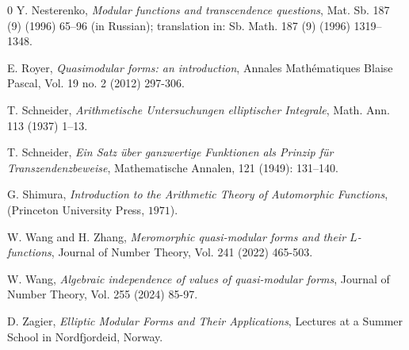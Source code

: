 \documentclass[11pt, reqno]{amsart}
\begin{document}
\begin{thebibliography}{0}
Y. Nesterenko, \textit{Modular functions and transcendence questions}, Mat. Sb. 187 (9)  (1996) 65–96 (in Russian); translation in: Sb. Math. 187 (9) (1996) 1319–1348.

E. Royer, \textit{Quasimodular forms: an introduction}, Annales Math\'ematiques Blaise Pascal, Vol. 19 no. 2 (2012) 297-306.

T. Schneider, \textit{Arithmetische Untersuchungen elliptischer Integrale}, Math. Ann. 113 (1937) 1–13.

T. Schneider, \textit{Ein Satz über ganzwertige Funktionen als Prinzip für Transzendenzbeweise}, Mathematische Annalen, 121 (1949): 131–140. 


 G. Shimura, \textit{Introduction to the Arithmetic Theory of Automorphic Functions}, (Princeton University Press, $1971$).

W. Wang and H. Zhang, \textit{Meromorphic quasi-modular forms and their $L$-functions}, Journal of Number Theory, Vol. 241 (2022) 465-503.


W. Wang, \textit{Algebraic independence of values of quasi-modular forms}, Journal of Number Theory, Vol. 255 (2024) 85-97.

D. Zagier, \textit{Elliptic Modular Forms and Their Applications}, Lectures at a Summer School
in Nordfjordeid, Norway.


\end{thebibliography}
\end{document}
